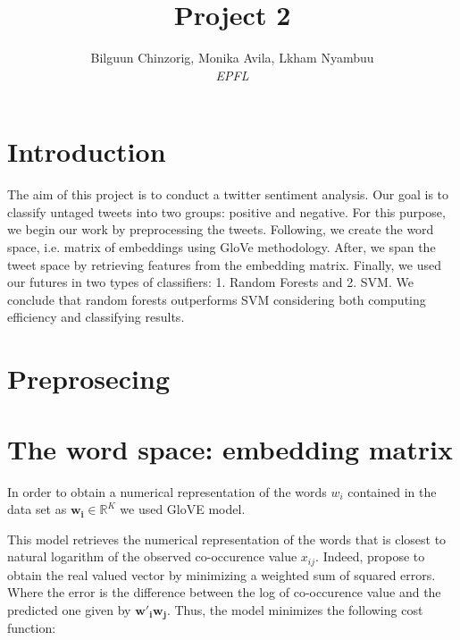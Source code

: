 \documentclass[10pt,conference,compsocconf]{IEEEtran}
\begin{document}
\title{Project 2}

\author{
Bilguun Chinzorig, Monika Avila, Lkham Nyambuu\\
  \textit{EPFL}
}

\maketitle

\begin{abstract}
  
\end{abstract}	\textbf{ }

\section{Introduction}

The aim of this project is to conduct a twitter sentiment analysis. Our goal is to classify untaged tweets into two groups: positive and negative. 
For this purpose, we begin our work by preprocessing the tweets. Following, we create the word space, i.e. matrix of embeddings using GloVe methodology. After, we span the tweet space by retrieving features from the embedding matrix. Finally, we used our futures in two types of classifiers: 1. Random Forests and 2. SVM. 
We conclude that random forests outperforms SVM considering both computing efficiency and classifying results. 

\section{Preprosecing}
\section{The word space: embedding matrix }
\label{S1}
In order to obtain a numerical representation of the words $w_i$ contained in the data set  as $\textbf{w}_{\textbf{i}} \in \mathbb{R}^K$ we used GloVE model. 

This model retrieves the numerical representation of the words that is closest to natural logarithm of the observed co-occurence value $x_{ij}$. Indeed,  \cite{pennington2014glove} propose to obtain the real valued vector by minimizing a weighted sum of squared errors. Where the error is the difference between the log of co-occurence value and the predicted one given by $\textbf{w}'_{\textbf{i}}\textbf{w}_{\textbf{j}}$. Thus, the model minimizes the following cost function: 
\end{document}

